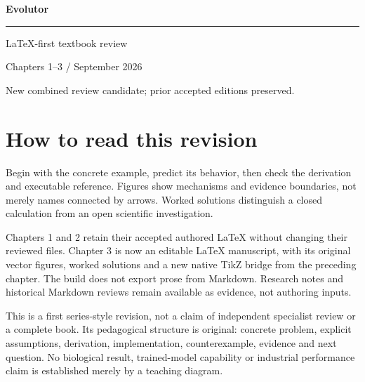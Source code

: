 \documentclass[11pt,oneside,openany]{book}
\begin{document}
\frontmatter
\begin{titlepage}
\color{BookBlue}\sffamily\vspace*{24mm}
{\fontsize{36}{42}\selectfont\bfseries Evolutor\par}
\vspace{12mm}{\Large Genomic Computation: Theory, Models, and Systems\par}
\vspace{14mm}\rule{\linewidth}{.8pt}\par
\vspace{7mm}{\large Define the mechanism. Derive the result. Test the claim.\par}
\vfill{\large LaTeX-first textbook review\par}
\vspace{5mm}Chapters 1--3 / September 2026\par
New combined review candidate; prior accepted editions preserved.
\end{titlepage}
\chapter*{How to read this revision}
Begin with the concrete example, predict its behavior, then check the derivation
and executable reference. Figures show mechanisms and evidence boundaries,
not merely names connected by arrows. Worked solutions distinguish a closed
calculation from an open scientific investigation.

Chapters 1 and 2 retain their accepted authored LaTeX without changing their
reviewed files. Chapter 3 is now an editable LaTeX manuscript, with its original
vector figures, worked solutions and a new native TikZ bridge from the preceding
chapter. The build does not export prose from Markdown. Research notes and
historical Markdown reviews remain available as evidence, not authoring inputs.

This is a first series-style revision, not a claim of independent specialist
review or a complete book. Its pedagogical structure is original: concrete
problem, explicit assumptions, derivation, implementation, counterexample,
evidence and next question. No biological result, trained-model capability or
industrial performance claim is established merely by a teaching diagram.

\tableofcontents
\mainmatter



\backmatter



\printindex
\end{document}
